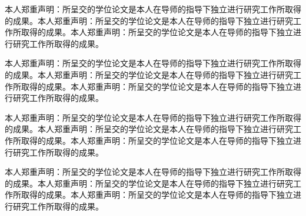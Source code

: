 \documentclass[class = professional, twoside, AutoFakeBold=3.17,AutoFakeSlant=0.2]{gdufe_master_thesis}
\begin{document}
本人郑重声明：所呈交的学位论文是本人在导师的指导下独立进行研究工作所取得的成果。本人郑重声明：所呈交的学位论文是本人在导师的指导下独立进行研究工作所取得的成果。本人郑重声明：所呈交的学位论文是本人在导师的指导下独立进行研究工作所取得的成果。

本人郑重声明：所呈交的学位论文是本人在导师的指导下独立进行研究工作所取得的成果。本人郑重声明：所呈交的学位论文是本人在导师的指导下独立进行研究工作所取得的成果。本人郑重声明：所呈交的学位论文是本人在导师的指导下独立进行研究工作所取得的成果。

本人郑重声明：所呈交的学位论文是本人在导师的指导下独立进行研究工作所取得的成果。本人郑重声明：所呈交的学位论文是本人在导师的指导下独立进行研究工作所取得的成果。本人郑重声明：所呈交的学位论文是本人在导师的指导下独立进行研究工作所取得的成果。

本人郑重声明：所呈交的学位论文是本人在导师的指导下独立进行研究工作所取得的成果。本人郑重声明：所呈交的学位论文是本人在导师的指导下独立进行研究工作所取得的成果。本人郑重声明：所呈交的学位论文是本人在导师的指导下独立进行研究工作所取得的成果。
\end{document}
